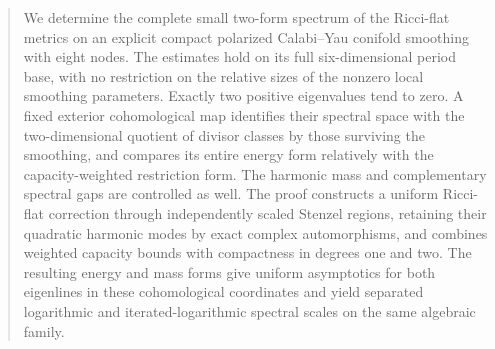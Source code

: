 

\begin{abstract}
We determine the complete small two-form spectrum of the Ricci-flat
metrics on an explicit compact polarized Calabi--Yau conifold smoothing
with eight nodes. The estimates hold on its full six-dimensional
period base, with no restriction on the relative sizes of the nonzero
local smoothing parameters. Exactly two positive eigenvalues tend to
zero. A fixed exterior cohomological map identifies their spectral
space with the two-dimensional quotient of divisor classes by those
surviving the smoothing, and compares its entire energy form relatively with the
capacity-weighted restriction form. The harmonic mass and complementary
spectral gaps are controlled as well. The proof constructs a uniform
Ricci-flat correction through independently scaled Stenzel regions,
retaining their quadratic harmonic modes by exact complex
automorphisms, and combines weighted capacity bounds with compactness
in degrees one and two. The resulting energy and mass forms give
uniform asymptotics for both eigenlines in these cohomological
coordinates and yield separated logarithmic and iterated-logarithmic
spectral scales on the same algebraic family.
\end{abstract}
\maketitle















